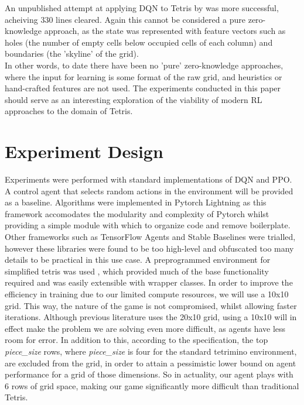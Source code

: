 \documentclass[12pt]{article}
\begin{document}
An unpublished attempt at applying DQN to Tetris by \textcite{liu2020learn} was more successful, acheiving 330 lines cleared. Again this cannot be considered a pure zero-knowledge approach, as the state was represented with feature vectors such as holes (the number of empty cells below occupied cells of each column) and boundaries (the 'skyline' of the grid). \\\newline
In other words, to date there have been no 'pure' zero-knowledge approaches, where the input for learning is some format of the raw grid, and heuristics or hand-crafted features are not used. The experiments conducted in this paper should serve as an interesting exploration of the viability of modern RL approaches to the domain of Tetris. 

\section{Experiment Design}\label{design}
Experiments were performed with standard implementations of DQN and PPO. A control agent that selects random actions in the environment will be provided as a baseline. Algorithms were implemented in Pytorch Lightning \autocite{Falcon_PyTorch_Lightning_2019} as this framework accomodates the modularity and complexity of Pytorch whilst providing a simple module with which to organize code and remove boilerplate. Other frameworks such as TensorFlow Agents \autocite{TFAgents} and Stable Baselines \autocite{stable-baselines} were trialled, however these libraries were found to be too high-level and obfuscated too many details to be practical in this use case. 
A preprogrammed environment for simplified tetris was used \autocite{Overend_gym-simplifiedtetris_package_for_2021}, which provided much of the base functionality required and was easily extensible with wrapper classes. In order to improve the efficiency in training due to our limited compute resources, we will use a 10x10 grid. This way, the nature of the game is not compromised, whilst allowing faster iterations. Although previous literature uses the 20x10 grid, using a 10x10 will in effect make the problem we are solving even more difficult, as agents have less room for error. In addition to this, according to the \textcite{fahey} specification, the top \textit{piece\_size} rows, where \textit{piece\_size} is four for the standard tetrimino environment, are excluded from the grid, in order to attain a pessimistic lower bound on agent performance for a grid of those dimensions. So in actuality, our agent plays with 6 rows of grid space, making our game significantly more difficult than traditional Tetris. 
\end{document}
